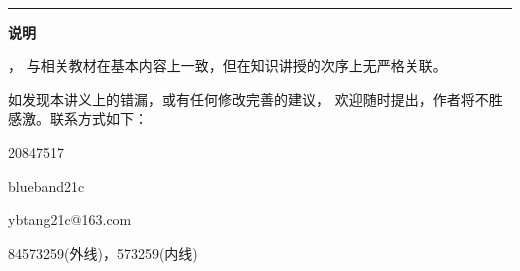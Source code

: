 






\setcounter{tocdepth}{3}%
\tableofcontents

\thispagestyle{empty}

\let\itemize\compactitem 
\let\enditemize\endcompactitem 
\let\enumerate\compactenum
\let\endenumerate\endcompactenum 
\let\description\compactdesc 
\let\enddescription\endcompactdesc
\setlength{\pltopsep}{0pt}
\setlength\abovedisplayskip{0pt}
\setlength\belowdisplayskip{0pt}


\bs\bs

\hrule

\bs\bs
{\bf 说明}

{，
与相关教材在基本内容上一致，但在知识讲授的次序上无严格关联。}

\bs

{\kaishu 如发现本讲义上的错漏，或有任何修改完善的建议，
欢迎随时提出，作者将不胜感激。联系方式如下：
\begin{itemize}
	\setlength{\itemindent}{2cm}
	\item[QQ] 20847517
	\item[WeChat] blueband21c
	\item[email] ybtang21c@163.com
	\item[phone] 84573259(外线)，573259(内线) 
\end{itemize}
}

\newpage

\setcounter{page}{1}




% 

% 

% 
% 
% 


